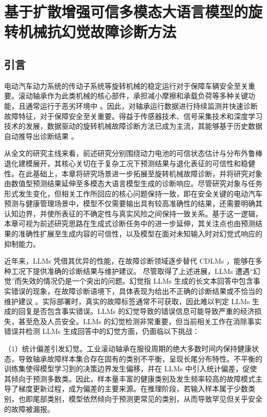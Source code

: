 \chapter{基于扩散增强可信多模态大语言模型的旋转机械抗幻觉故障诊断方法}\label{chap:DA-TMLLM}

\section{引言}\label{sec:DA-TMLLM_introduction}

电动汽车动力系统的传动子系统等旋转机械的稳定运行对于保障车辆安全至关重要。滚动轴承作为此类机械的核心部件，承担减小摩擦和承载负荷等多种关键功能，且通常运行于恶劣环境中 \cite{PU, JUST}。因此，对轴承运行数据进行持续监测并快速诊断故障特征，对于保障安全至关重要。得益于传感器技术、信号采集技术和深度学习技术的发展，数据驱动的旋转机械故障诊断方法已成为主流，其能够基于历史数据自动推导出诊断结果 \cite{10577994, HIT}。

从全文的研究主线来看，前述研究分别围绕动力电池的可信状态估计与分布外鲁棒退化建模展开，其核心关切在于复杂工况下预测结果与退化表征的可信性和稳健性。在此基础上，本章将研究场景进一步拓展至旋转机械故障诊断，并将研究对象由数值型预测结果延伸至多模态大语言模型生成的诊断响应。尽管研究对象与任务形式发生变化，但相关工作所回应的核心问题保持一致，即在安全关键的电动汽车预测与健康管理场景中，模型不仅需要输出具有较高准确性的结果，还需要明确其认知边界，并使所表征的不确定性与真实风险之间保持一致关系。基于这一逻辑，本章可视为前述研究思路在生成式诊断任务中的进一步延伸，其关注点也由预测结果的准确性扩展至生成内容的可信性，以及模型在面对未知输入时对幻觉式响应的抑制能力。

近年来，LLMs 凭借其优异的性能，在故障诊断领域逐步替代 CDLMs \cite{Peng_Liu_Du_Gao_Wang_2025}，能够在多种工况下提供准确的诊断结果与维护建议。
尽管取得了上述进展，LLMs 遭遇“幻觉”而失效的情况仍是一个突出的问题。幻觉指 LLMs 生成的长文本回答中包含事实错误的现象，在故障诊断语境下，具体表现为给出不正确的诊断结果或不恰当的维护建议 \cite{li-etal-2023-halueval, azaria-mitchell-2023-internal}。实际部署时，真实的故障标签通常不可获取，因此难以判定 LLMs 生成的回复是否包含事实错误。LLMs 的幻觉导致的错误信息可能导致严重的经济损失，甚至危及人员安全。LLMs 的幻觉检测非常重要，但当前相关工作在消除事实错误并检测 LLMs 生成回答中的幻觉方面，仍面临以下挑战：

（1）统计偏差引发幻觉。工业滚动轴承在服役周期的绝大多数时间内保持健康状态，导致轴承故障样本集合存在固有的类别不平衡，呈现长尾分布特性。不平衡的训练集使得模型学习到的决策边界发生偏移，并在 LLMs 中引入统计偏差，促使其倾向于预测多数类。因此，样本量丰富的健康类别及发生频率较高的故障模式主导了梯度更新过程，成为偏差的主要来源。在推理阶段，若输入样本属于少数类别，也即尾部类别，模型依然倾向于预测更常见的类别，从而导致罕见但关乎安全的故障被漏报。

